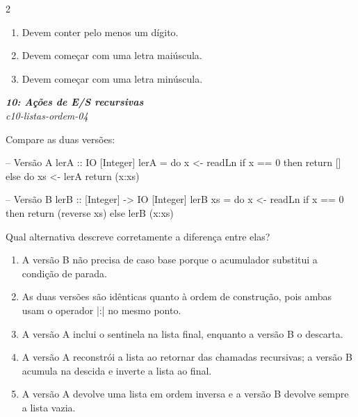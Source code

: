 \documentclass[a4paper,10pt,brazil]{article}
\begin{document}
\begin{multicols}{2}
\begin{enumerate}
  \item Devem conter pelo menos um dígito.

  \item Devem começar com uma letra maiúscula.

  \item Devem começar com uma letra minúscula.


\end{enumerate}

\begin{flushright}
  \footnotesize
  \textit{\textbf{10: Ações de E/S recursivas}}\\
  \textit{c10-listas-ordem-04}\\

\end{flushright}
Compare as duas versões:

\begin{haskellcode}
-- Versão A
lerA :: IO [Integer]
lerA = do
  x <- readLn
  if x == 0
    then return []
    else do
      xs <- lerA
      return (x:xs)

-- Versão B
lerB :: [Integer] -> IO [Integer]
lerB xs = do
  x <- readLn
  if x == 0
    then return (reverse xs)
    else lerB (x:xs)
\end{haskellcode}

Qual alternativa descreve corretamente a diferença entre elas?

\begin{enumerate}
  \item A versão B não precisa de caso base porque o acumulador substitui a condição de parada.

  \item As duas versões são idênticas quanto à ordem de construção, pois ambas usam o operador \haskellinline|:| no mesmo ponto.

  \item A versão A inclui o sentinela na lista final, enquanto a versão B o descarta.

  \item A versão A reconstrói a lista ao retornar das chamadas recursivas; a versão B acumula na descida e inverte a lista ao final.

  \item A versão A devolve uma lista em ordem inversa e a versão B devolve sempre a lista vazia.


\end{enumerate}


\end{multicols}
\end{document}
